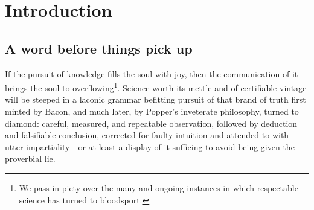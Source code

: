 
\chapter{Introduction}
\label{chp:1}


\section{A word before things pick up}

If the pursuit of knowledge fills the soul with joy, then the
communication of it brings the soul to overflowing\footnote{We pass in
  piety over the many and ongoing instances in which respectable
  science has turned to bloodsport.}. Science worth its mettle and of
certifiable vintage will be steeped in a laconic grammar befitting
pursuit of that brand of truth first minted by Bacon, and much later,
by Popper's inveterate philosophy, turned to diamond: careful,
measured, and repeatable observation, followed by deduction and
falsifiable conclusion, corrected for faulty intuition and attended to
with utter impartiality---or at least a display of it sufficing to
avoid being given the proverbial lie.

